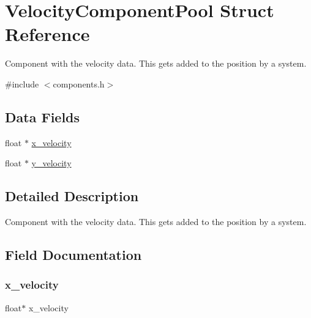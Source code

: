 \hypertarget{struct_velocity_component_pool}{}\section{Velocity\+Component\+Pool Struct Reference}
\label{struct_velocity_component_pool}


Component with the velocity data. This gets added to the position by a system.  




{\ttfamily \#include $<$components.\+h$>$}

\subsection*{Data Fields}
\begin{DoxyCompactItemize}
\item 
float $\ast$ \mbox{\hyperlink{struct_velocity_component_pool_a894c40834929b9d5f24377c2c4308432}{x\+\_\+velocity}}
\item 
float $\ast$ \mbox{\hyperlink{struct_velocity_component_pool_aaf5dda6f5c06e80a111272ce1fe7b208}{y\+\_\+velocity}}
\end{DoxyCompactItemize}


\subsection{Detailed Description}
Component with the velocity data. This gets added to the position by a system. 

\subsection{Field Documentation}
\mbox{\label{struct_velocity_component_pool_a894c40834929b9d5f24377c2c4308432}} 
\subsubsection{\texorpdfstring{x\+\_\+velocity}{x\_velocity}}
{\footnotesize\ttfamily float$\ast$ x\+\_\+velocity}

\mbox{\label{struct_velocity_component_pool_aaf5dda6f5c06e80a111272ce1fe7b208}} 
